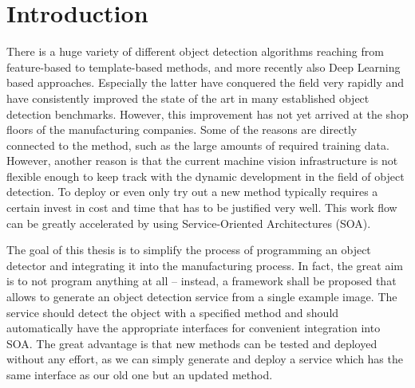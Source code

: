 \chapter{Introduction\label{cha:chapter1}}
There is a huge variety of different object detection algorithms reaching from feature-based to template-based methods, and more recently also Deep Learning based approaches. Especially the latter have conquered the field very rapidly and have consistently improved the state of the art in many established object detection benchmarks. However, this improvement has not yet arrived at the shop floors of the manufacturing companies. Some of the reasons are directly connected to the method, such as the large amounts of required training data. However, another reason is that the current machine vision infrastructure is not flexible enough to keep track with the dynamic development in the field of object detection. To deploy or even only try out a new method typically requires a certain invest in cost and time that has to be justified very well. This work flow can be greatly accelerated by using Service-Oriented Architectures (SOA).

The goal of this thesis is to simplify the process of programming an object detector and integrating it into the manufacturing process. In fact, the great aim is to not program anything at all – instead, a framework shall be proposed that allows to generate an object detection service from a single example image.
The service should detect the object with a specified method and should automatically have the appropriate interfaces for convenient integration into SOA. The great advantage is that new methods can be tested and deployed without any effort, as we can simply generate and deploy a service which has the same interface as our old one but an updated method.
 